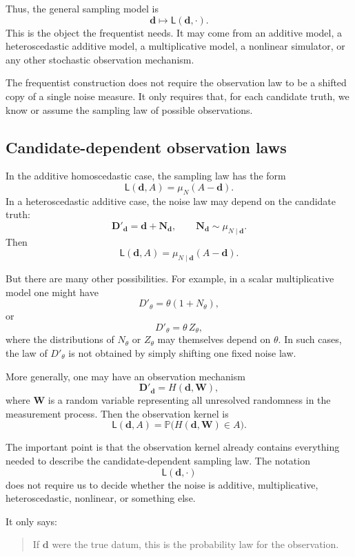 \documentclass[11pt]{article}
\newcommand{\muN}{\mu_N}
\newcommand{\Dobsrand}{\mathbf D'}
\newcommand{\Nrand}{\mathbf N}
\newcommand{\Prob}{\mathbb P}
\begin{document}
Thus, the general sampling model is
\[
    \mathbf d
    \longmapsto
    \mathsf L(\mathbf d,\cdot).
\]
This is the object the frequentist needs. It may come from an additive model, a heteroscedastic additive model, a multiplicative model, a nonlinear simulator, or any other stochastic observation mechanism.

The frequentist construction does not require the observation law to be a shifted copy of a single noise measure. It only requires that, for each candidate truth, we know or assume the sampling law of possible observations.

\subsection{Candidate-dependent observation laws}

In the additive homoscedastic case, the sampling law has the form
\[
    \mathsf L(\mathbf d,A)
    =
    \muN(A-\mathbf d).
\]
In a heteroscedastic additive case, the noise law may depend on the candidate truth:
\[
    \Dobsrand_{\mathbf d}
    =
    \mathbf d+\Nrand_{\mathbf d},
    \qquad
    \Nrand_{\mathbf d}\sim\mu_{N\mid\mathbf d}.
\]
Then
\[
    \mathsf L(\mathbf d,A)
    =
    \mu_{N\mid\mathbf d}(A-\mathbf d).
\]

But there are many other possibilities. For example, in a scalar multiplicative model one might have
\[
    D'_{\theta}
    =
    \theta(1+N_{\theta}),
\]
or
\[
    D'_{\theta}
    =
    \theta\,Z_{\theta},
\]
where the distributions of \(N_{\theta}\) or \(Z_{\theta}\) may themselves depend on \(\theta\). In such cases, the law of \(D'_{\theta}\) is not obtained by simply shifting one fixed noise law.

More generally, one may have an observation mechanism
\[
    \Dobsrand_{\mathbf d}
    =
    H(\mathbf d,\mathbf W),
\]
where \(\mathbf W\) is a random variable representing all unresolved randomness in the measurement process. Then the observation kernel is
\[
    \mathsf L(\mathbf d,A)
    =
    \Prob\bigl(H(\mathbf d,\mathbf W)\in A\bigr).
\]

The important point is that the observation kernel already contains everything needed to describe the candidate-dependent sampling law. The notation
\[
    \mathsf L(\mathbf d,\cdot)
\]
does not require us to decide whether the noise is additive, multiplicative, heteroscedastic, nonlinear, or something else.

It only says:
\begin{quote}
    If \(\mathbf d\) were the true datum, this is the probability law for the observation.
\end{quote}
\end{document}
